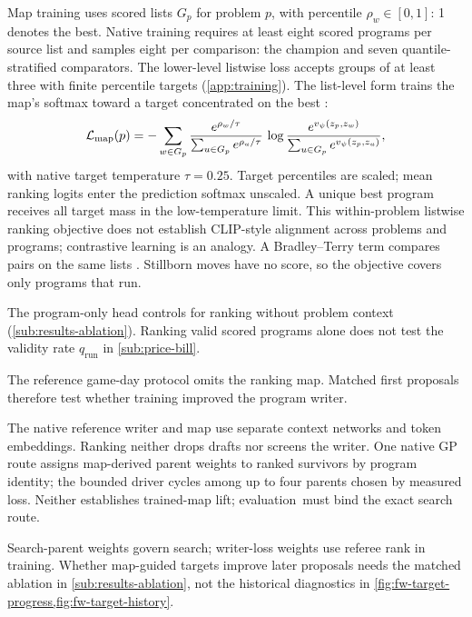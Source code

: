 Map training uses scored lists $G_p$ for problem $p$, with percentile
$\rho_w\in[0,1]$: 1 denotes the best. Native training requires at least
eight scored programs per source list and samples eight per comparison:
the champion and seven quantile-stratified comparators. The lower-level
listwise loss accepts groups of at least three with finite percentile
targets (\cref{app:training}). The list-level form trains the map's softmax
toward a target concentrated on the best
\citep{cao2007listnet}:
\begin{equation}
  \mathcal{L}_{\mathrm{map}}(p)=-\sum_{w\in G_p}
  \frac{e^{\rho_w/\tau}}{\sum_{u\in G_p}e^{\rho_u/\tau}}\,
  \log\frac{e^{v_{\psi}(z_p,z_w)}}{\sum_{u\in G_p}e^{v_{\psi}(z_p,z_u)}},
  \label{eq:mapLoss}
\end{equation}
with native target temperature $\tau=0.25$. Target percentiles are scaled;
mean ranking logits enter the prediction softmax unscaled. A unique best
program receives all target mass in the low-temperature limit. This
within-problem listwise ranking objective does not establish CLIP-style
alignment across problems and programs; contrastive learning
\citep{oord2018cpc,radford2021clip} is an analogy. A Bradley--Terry term
compares pairs on the same lists \citep{bradley1952rank}. Stillborn moves
have no score, so the objective covers only programs that run.

The program-only head controls for ranking without problem context
(\cref{sub:results-ablation}). Ranking valid scored programs alone does not
test the validity rate $q_{\mathrm{run}}$ in \cref{sub:price-bill}.

\begin{keyidea}
The reference game-day protocol omits the ranking map. Matched first
proposals therefore test whether training improved the program writer.
\end{keyidea}

The native reference writer and map use separate context networks and
token embeddings. Ranking neither drops drafts nor screens the writer.
One native GP route assigns map-derived parent weights to ranked
survivors by program identity; the bounded driver cycles among up to
four parents chosen by measured loss. Neither establishes trained-map
lift; \mbox{evaluation must} bind the exact search route.

Search-parent weights govern search; writer-loss weights use referee rank
in training. Whether map-guided targets improve later proposals needs
the matched ablation in \cref{sub:results-ablation}, not the historical
diagnostics in \cref{fig:fw-target-progress,fig:fw-target-history}.

